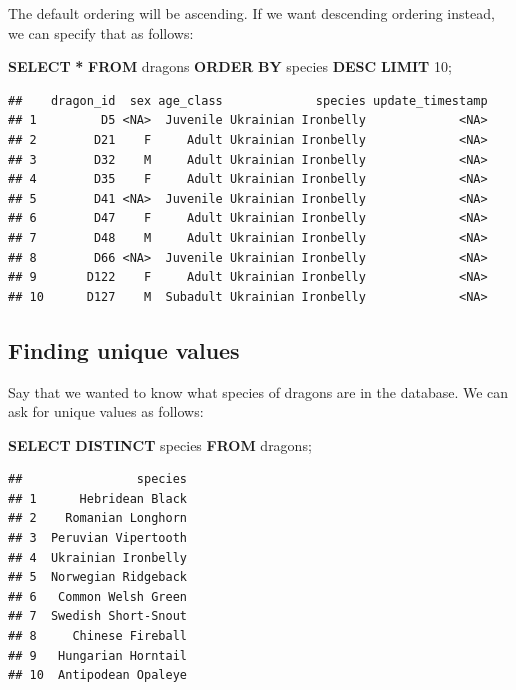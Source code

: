 \documentclass[
]{book}
\newenvironment{Shaded}{\begin{snugshade}}{\end{snugshade}}
\newcommand{\DecValTok}[1]{\textcolor[rgb]{0.00,0.00,0.81}{#1}}
\newcommand{\KeywordTok}[1]{\textcolor[rgb]{0.13,0.29,0.53}{\textbf{#1}}}
\newcommand{\NormalTok}[1]{#1}
\newcommand{\OperatorTok}[1]{\textcolor[rgb]{0.81,0.36,0.00}{\textbf{#1}}}
\begin{document}
The default ordering will be ascending. If we want descending ordering instead,
we can specify that as follows:

\begin{Shaded}
\begin{Highlighting}[]
\KeywordTok{SELECT} \OperatorTok{*} 
\KeywordTok{FROM}\NormalTok{ dragons }
\KeywordTok{ORDER} \KeywordTok{BY}\NormalTok{ species }\KeywordTok{DESC}
\KeywordTok{LIMIT} \DecValTok{10}\NormalTok{;}
\end{Highlighting}
\end{Shaded}

\begin{verbatim}
##    dragon_id  sex age_class             species update_timestamp
## 1         D5 <NA>  Juvenile Ukrainian Ironbelly             <NA>
## 2        D21    F     Adult Ukrainian Ironbelly             <NA>
## 3        D32    M     Adult Ukrainian Ironbelly             <NA>
## 4        D35    F     Adult Ukrainian Ironbelly             <NA>
## 5        D41 <NA>  Juvenile Ukrainian Ironbelly             <NA>
## 6        D47    F     Adult Ukrainian Ironbelly             <NA>
## 7        D48    M     Adult Ukrainian Ironbelly             <NA>
## 8        D66 <NA>  Juvenile Ukrainian Ironbelly             <NA>
## 9       D122    F     Adult Ukrainian Ironbelly             <NA>
## 10      D127    M  Subadult Ukrainian Ironbelly             <NA>
\end{verbatim}

\hypertarget{finding-unique-values}{%
\subsection{Finding unique values}\label{finding-unique-values}}

Say that we wanted to know what species of dragons are in the database. We can
ask for unique values as follows:

\begin{Shaded}
\begin{Highlighting}[]
\KeywordTok{SELECT} \KeywordTok{DISTINCT}\NormalTok{ species }
\KeywordTok{FROM}\NormalTok{ dragons;}
\end{Highlighting}
\end{Shaded}

\begin{verbatim}
##                species
## 1      Hebridean Black
## 2    Romanian Longhorn
## 3  Peruvian Vipertooth
## 4  Ukrainian Ironbelly
## 5  Norwegian Ridgeback
## 6   Common Welsh Green
## 7  Swedish Short-Snout
## 8     Chinese Fireball
## 9   Hungarian Horntail
## 10  Antipodean Opaleye
\end{verbatim}
\end{document}
